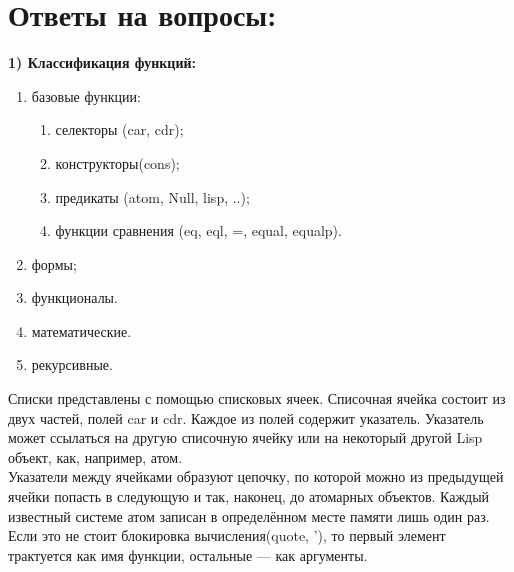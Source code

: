 \documentclass[a4paper, 12pt]{article}
\begin{document}
\section*{Ответы на вопросы:}
\hspace*{-7mm} \textbf{1) Классификация функций:}
\begin{enumerate}
	\item базовые функции:
	\begin{enumerate}
		\item селекторы (car, cdr);
		\item конструкторы(cons);
		\item предикаты (atom, Null, lisp, ..);
		\item функции сравнения (eq, eql, =, equal, equalp).
	\end{enumerate}
	\item формы;
	\item функционалы.
	\item математические.
	\item рекурсивные.
\end{enumerate}
\hspace*{-6mm}Списки представлены с помощью списковых ячеек. Списочная ячейка состоит из двух частей, полей car и cdr. Каждое из полей содержит указатель. Указатель может ссылаться на другую списочную ячейку или на некоторый другой Lisp объект, как, например, атом.
\\ Указатели между ячейками образуют цепочку, по которой можно из предыдущей ячейки попасть в следующую и так, наконец, до атомарных объектов. Каждый известный системе атом записан в определённом месте памяти лишь один раз.
\\Если это  не стоит блокировка вычисления(quote, '), то первый элемент трактуется как имя функции, остальные — как аргументы.
\end{document}
